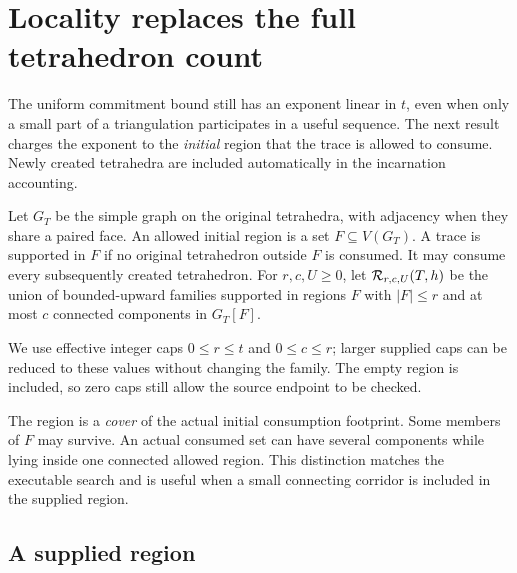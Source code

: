 \section{Locality replaces the full tetrahedron count}\label{sec:regions}

The uniform commitment bound still has an exponent linear in $t$, even when
only a small part of a triangulation participates in a useful sequence. The
next result charges the exponent to the \emph{initial} region that the trace
is allowed to consume. Newly created tetrahedra are included automatically
in the incarnation accounting.

\begin{definition}
Let $G_T$ be the simple graph on the original tetrahedra, with adjacency when
they share a paired face. An allowed initial region is a set
$F\subseteq V(G_T)$. A trace is supported in $F$ if no original tetrahedron
outside $F$ is consumed. It may consume every subsequently created tetrahedron.
For $r,c,U\ge0$, let $\mathcal R_{r,c,U}(T,h)$ be the union of bounded-upward
families supported in regions $F$ with $|F|\le r$ and at most $c$ connected
components in $G_T[F]$.
\end{definition}

We use effective integer caps $0\le r\le t$ and $0\le c\le r$;
larger supplied caps can be reduced to these values without changing the
family. The empty region is included, so zero caps still allow the source
endpoint to be checked.

The region is a \emph{cover} of the actual initial consumption footprint.
Some members of $F$ may survive. An actual consumed set can have several
components while lying inside one connected allowed region. This distinction
matches the executable search and is useful when a small connecting corridor
is included in the supplied region.

\subsection{A supplied region}

